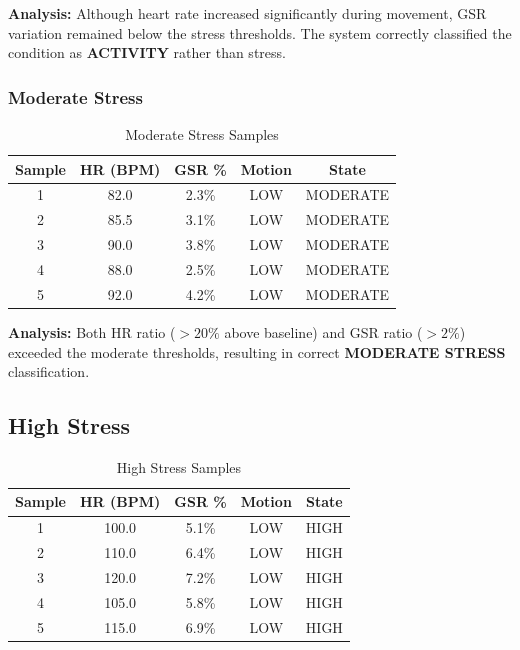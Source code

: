 \documentclass[a4paper,12pt]{report}
\begin{document}
\textbf{Analysis:} Although heart rate increased significantly during movement, GSR variation remained below the stress thresholds. The system correctly classified the condition as \textbf{ACTIVITY} rather than stress.

\subsubsection{Moderate Stress} \label{subsec:moderate_stress}

\begin{table}[h]
\centering
\caption{Moderate Stress Samples}
\renewcommand{\arraystretch}{1.2}
\begin{tabular}{|c|c|c|c|c|}
\hline
\textbf{Sample} & \textbf{HR (BPM)} & \textbf{GSR \%} & \textbf{Motion} & \textbf{State} \\
\hline
1 & 82.0 & 2.3\% & LOW & MODERATE \\
2 & 85.5 & 3.1\% & LOW & MODERATE \\
3 & 90.0 & 3.8\% & LOW & MODERATE \\
4 & 88.0 & 2.5\% & LOW & MODERATE \\
5 & 92.0 & 4.2\% & LOW & MODERATE \\
\hline
\end{tabular}
\label{tab:moderate_samples}
\end{table}

\textbf{Analysis:} Both HR ratio ($> 20\%$ above baseline) and GSR ratio ($> 2\%$) exceeded the moderate thresholds, resulting in correct \textbf{MODERATE STRESS} classification.

\subsection{High Stress} \label{subsec:high_stress}

\begin{table}[h]
\centering
\caption{High Stress Samples}
\renewcommand{\arraystretch}{1.2}
\begin{tabular}{|c|c|c|c|c|}
\hline
\textbf{Sample} & \textbf{HR (BPM)} & \textbf{GSR \%} & \textbf{Motion} & \textbf{State} \\
\hline
1 & 100.0 & 5.1\% & LOW & HIGH \\
2 & 110.0 & 6.4\% & LOW & HIGH \\
3 & 120.0 & 7.2\% & LOW & HIGH \\
4 & 105.0 & 5.8\% & LOW & HIGH \\
5 & 115.0 & 6.9\% & LOW & HIGH \\
\hline
\end{tabular}
\label{tab:high_samples}
\end{table}
\end{document}
